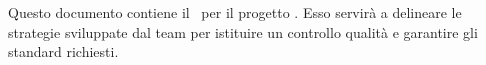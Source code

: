 Questo documento contiene il \PdQ\ per il progetto \progetto. Esso servirà a delineare le strategie sviluppate dal team per istituire un controllo qualità e garantire gli standard richiesti.